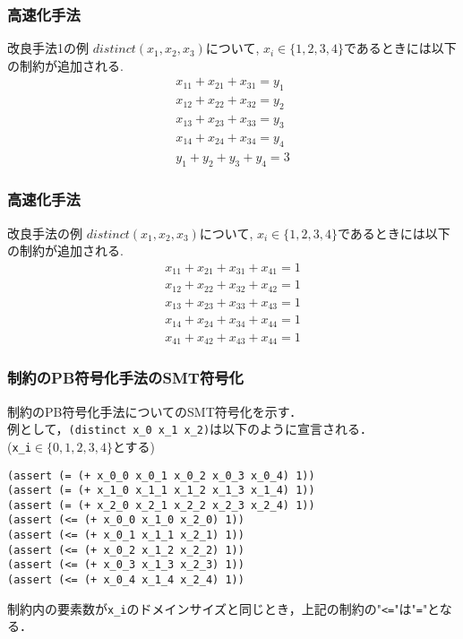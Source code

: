 \begin{frame}
    \frametitle{高速化手法}
    \vspace{-3mm}
    \begin{exampleblock}{改良手法1の例}
        $distinct(x_1, x_2, x_3)$について, $x_i \in \{1, 2, 3, 4\}$であるときには以下の制約が追加される.\\
        \vspace{-3mm}
        \begin{eqnarray*}
            x_{11}+x_{21}+x_{31}=y_1\\
            x_{12}+x_{22}+x_{32}=y_2\\
            x_{13}+x_{23}+x_{33}=y_3\\
            x_{14}+x_{24}+x_{34}=y_4\\
            y_1+y_2+y_3+y_4=3
        \end{eqnarray*}
    \end{exampleblock}
\end{frame}
\begin{frame}
    \frametitle{高速化手法}
    \vspace{-3mm}
    \begin{exampleblock}{改良手法の例}
        $distinct(x_1, x_2, x_3)$について, $x_i \in \{1, 2, 3, 4\}$であるときには以下の制約が追加される.\\
        \vspace{-3mm}
        \begin{eqnarray*}
            x_{11}+x_{21}+x_{31}+x_{41}=1\\
            x_{12}+x_{22}+x_{32}+x_{42}=1\\
            x_{13}+x_{23}+x_{33}+x_{43}=1\\
            x_{14}+x_{24}+x_{34}+x_{44}=1\\
            x_{41}+x_{42}+x_{43}+x_{44}=1
        \end{eqnarray*}

    \end{exampleblock}
\end{frame}
\begin{frame}[fragile]
    \frametitle{\distinct 制約のPB符号化手法のSMT符号化}
    \distinct 制約のPB符号化手法についてのSMT符号化を示す．\\
    例として，\verb|(distinct x_0 x_1 x_2)|は以下のように宣言される．\\
    (\verb|x_i|$\in \{0,1,2,3,4\}$とする)
    \begin{exampleblock}{}\scriptsize
\begin{verbatim}
(assert (= (+ x_0_0 x_0_1 x_0_2 x_0_3 x_0_4) 1))
(assert (= (+ x_1_0 x_1_1 x_1_2 x_1_3 x_1_4) 1))
(assert (= (+ x_2_0 x_2_1 x_2_2 x_2_3 x_2_4) 1))
(assert (<= (+ x_0_0 x_1_0 x_2_0) 1))
(assert (<= (+ x_0_1 x_1_1 x_2_1) 1))
(assert (<= (+ x_0_2 x_1_2 x_2_2) 1))
(assert (<= (+ x_0_3 x_1_3 x_2_3) 1))
(assert (<= (+ x_0_4 x_1_4 x_2_4) 1))
\end{verbatim}
    \end{exampleblock}
    \distinct 制約内の要素数が\verb|x_i|のドメインサイズと同じとき，上記の制約の"\verb|<=|"は"\verb|=|"となる．
\end{frame}
